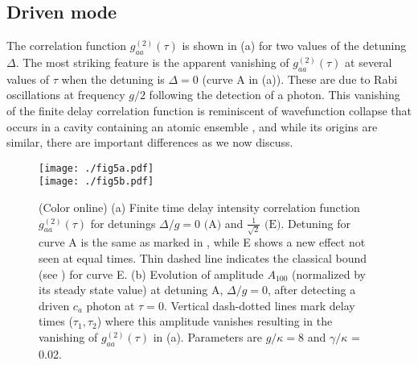 \subsection{Driven mode}
The
correlation function $g^{(2)}_{aa}(\tau)$ is shown in (a)
for two values of the detuning $\Delta$.
The most striking feature
is the apparent vanishing of  $g^{(2)}_{aa}(\tau)$
at several values of $\tau$ when the
detuning is $\Delta = 0$ (curve A in (a)).
These are due to Rabi oscillations at frequency
$g/2$ following the detection of a photon.
This vanishing of the finite delay correlation function
is reminiscent of  wavefunction collapse that
occurs in a cavity containing an 
atomic ensemble \cite{Carmichael1991},
and while its origins are similar, there are important
differences as we now discuss.
\begin{figure}[tb] \centering
  \texttt{[image: ./fig5a.pdf]}\\[-0.5cm]
  \texttt{[image: ./fig5b.pdf]}
  \caption{
  \label{fig:g2aatau}(Color online)
  (a) Finite time delay intensity
  correlation function $g^{(2)}_{aa}(\tau)$  for detunings
  $\Delta/g = 0 \text{ (A)}$ and $\frac{1}{\sqrt{2}}
  \text{ (E)}$.
  Detuning for curve A is the same as marked in ,
  while E shows a new effect not seen at equal times.
  Thin dashed line indicates the classical bound 
  (see ) for curve E. 
  (b) Evolution of amplitude $A_{100}$ (normalized by its
  steady state value)
  at detuning A, $\Delta/g = 0$,
  after detecting a driven $c_a$ photon at $\tau = 0$. 
  Vertical dash-dotted lines mark delay times ($\tau_1, \tau_2$) where this amplitude
  vanishes resulting in the vanishing of $g^{(2)}_{aa}(\tau)$
  in (a).
  Parameters are $g/\kappa = 8$ and $\gamma/\kappa$ = 0.02. 
  } 
\end{figure}



